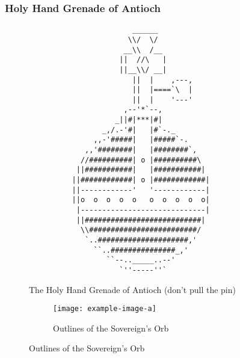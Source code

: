 \documentclass{metanorma}
\begin{document}


\label{holy_hand_grenade}
\subsubsection{Holy Hand Grenade of Antioch}



\begin{figure}[h]\centering
\label{hand-grenade-figure}
\caption{The Holy Hand Grenade of Antioch (don't pull the pin)}
\begin{verbatim}
                        ______
                       \\/  \/
                      __\\  /__
                     ||  //\   |
                     ||__\\/ __|
                        ||  |    ,---,
                        ||  |====`\  |
                        ||  |    '---'
                      ,--'*`--,
                    _||#|***|#|
                 _,/.-'#|   |#`-._
               ,,-'#####|   |#####`-.
             ,,'########|   |########`,
            //##########| o |##########\
           ||###########|   |###########|
          ||############| o |############|
          ||------------'   '------------|
          ||o  o  o  o  o   o  o  o  o  o|
           |-----------------------------|
           ||###########################|
            \\#########################/
             `..#####################,'
               ``..###############_,'
                  ``--.._____..--'
                     `''-----''`
\end{verbatim}
\end{figure}




\begin{figure}[h]\centering
\label{sovereign-orb}
\caption{The Sovereign's Orb made invisible}

  \begin{subfigure}[b]{0.4\textwidth}
    \texttt{[image: example-image-a]}
    \caption{Outlines of the Sovereign's Orb}
  \end{subfigure}
\end{figure}
\end{document}
